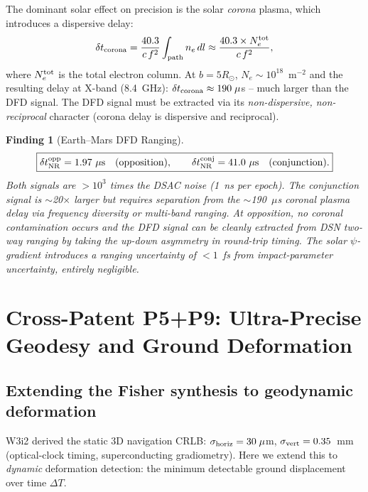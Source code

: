 \documentclass[aps,prd,twocolumn,superscriptaddress,nofootinbib,longbibliography]{revtex4-2}
\newtheorem{finding}{Finding}
\begin{document}
The dominant solar effect on precision is the solar \emph{corona} plasma,
which introduces a dispersive delay:
\begin{equation}
\delta t_{\rm corona} = \frac{40.3}{c\,f^2}\int_{\rm path} n_e\,dl
\approx \frac{40.3\times N_e^{\rm tot}}{c\,f^2},
\end{equation}
where $N_e^{\rm tot}$ is the total electron column.  At $b = 5R_\odot$,
$N_e\sim10^{18}$~m$^{-2}$ and the resulting delay at X-band (8.4~GHz):
$\delta t_{\rm corona}\approx 190\;\mu$s -- much larger than the DFD signal.
The DFD signal must be extracted via its \emph{non-dispersive, non-reciprocal}
character (corona delay is dispersive and reciprocal).

\begin{finding}[Earth--Mars DFD Ranging]
\label{finding:mars-ranging}
\begin{equation}
\boxed{
\delta t_{\rm NR}^{\rm opp} = 1.97\ \mu\si{s}\quad(\text{opposition}),\qquad
\delta t_{\rm NR}^{\rm conj} = 41.0\ \mu\si{s}\quad(\text{conjunction}).
}
\end{equation}
Both signals are $>10^3$ times the DSAC noise (1~ns per epoch).
The conjunction signal is $\sim$20$\times$ larger but requires separation
from the $\sim$190~$\mu$s coronal plasma delay via frequency diversity
or multi-band ranging.  At opposition, no coronal contamination occurs
and the DFD signal can be cleanly extracted from DSN two-way ranging
by taking the up-down asymmetry in round-trip timing.
The solar $\psi$-gradient introduces a ranging uncertainty of $<1$~fs
from impact-parameter uncertainty, entirely negligible.
\end{finding}

\section{Cross-Patent P5+P9: Ultra-Precise Geodesy and Ground Deformation}
\label{sec:geodesy}

\subsection{Extending the Fisher synthesis to geodynamic deformation}

W3i2 derived the static 3D navigation CRLB: $\sigma_{\rm horiz} = 30\;\mu$m,
$\sigma_{\rm vert} = 0.35$~mm (optical-clock timing, superconducting gradiometry).
Here we extend this to \emph{dynamic} deformation detection: the minimum
detectable ground displacement over time $\Delta T$.
\end{document}
